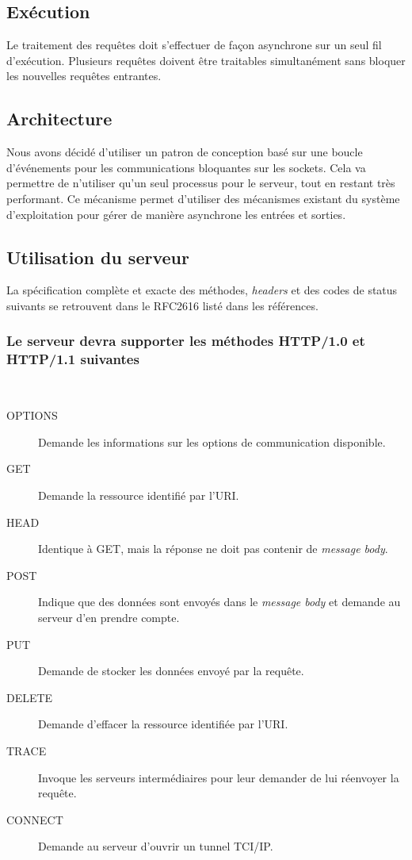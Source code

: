 \documentclass{scrreprt}
\begin{document}
\subsection{Exécution}
Le traitement des requêtes doit s'effectuer de façon asynchrone sur un seul fil
d'exécution. Plusieurs requêtes doivent être traitables simultanément sans bloquer
les nouvelles requêtes entrantes.
\subsection{Architecture}
Nous avons décidé d'utiliser un patron de conception basé sur
une boucle d’événements pour les communications bloquantes sur les sockets. Cela va 
permettre de n'utiliser qu'un seul processus pour le serveur, tout en restant très performant.
Ce mécanisme permet d'utiliser des mécanismes existant du système d'exploitation
pour gérer de manière asynchrone les entrées et sorties\cite{c10k}.



\subsection{Utilisation du serveur}
La spécification complète et exacte des méthodes, \textit{headers} et des codes de status suivants se retrouvent dans le RFC2616 listé dans les références.
\subsubsection{Le serveur devra supporter les méthodes HTTP/1.0 et HTTP/1.1 suivantes}\\
\begin{description}
 \item [OPTIONS] Demande les informations sur les options de communication disponible.
 \item [GET] Demande la ressource identifié par l'URI.
 \item [HEAD] Identique à GET, mais la réponse ne doit pas contenir de \textit{message body}.
 \item [POST] Indique que des données sont envoyés dans le \textit{message body} et demande au serveur d'en prendre compte.
 \item [PUT] Demande de stocker les données envoyé par la requête.
 \item [DELETE] Demande d'effacer la ressource identifiée par l'URI.
 \item [TRACE] Invoque les serveurs intermédiaires pour leur demander de lui réenvoyer la requête.
 \item [CONNECT] Demande au serveur d'ouvrir un tunnel TCI/IP.
 
\end{description}
\\\\
\end{document}
